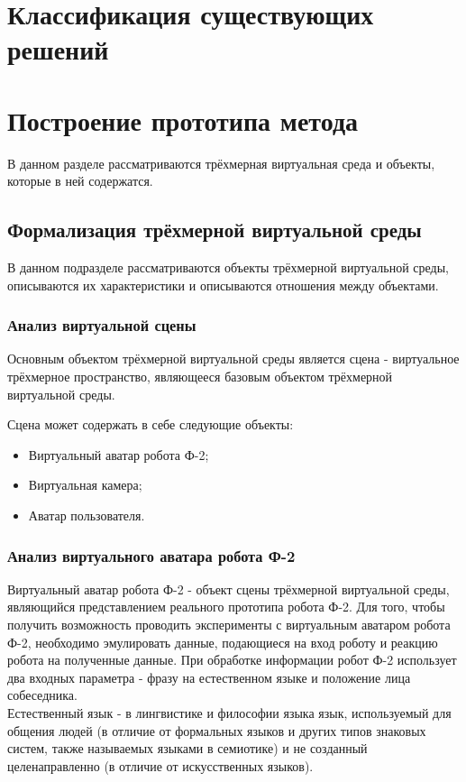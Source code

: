 \chapter{Классификация существующих решений}

\chapter{Построение прототипа метода}
В данном разделе рассматриваются трёхмерная виртуальная среда и объекты, которые в ней содержатся.

\section{Формализация трёхмерной виртуальной среды}
В данном подразделе рассматриваются объекты трёхмерной виртуальной среды, описываются их характеристики и описываются отношения между объектами.

\subsection{Анализ виртуальной сцены}
Основным объектом трёхмерной виртуальной среды является сцена - виртуальное трёхмерное пространство, являющееся базовым объектом трёхмерной виртуальной среды.

Сцена может содержать в себе следующие объекты:
\begin{itemize}
	\item Виртуальный аватар робота Ф-2;
	\item Виртуальная камера;
	\item Аватар пользователя.
\end{itemize}

\subsection{Анализ виртуального аватара робота Ф-2}
Виртуальный аватар робота Ф-2 - объект сцены трёхмерной виртуальной среды, являющийся представлением реального прототипа робота Ф-2.  Для того, чтобы получить возможность проводить эксперименты с виртуальным аватаром робота Ф-2, необходимо эмулировать данные, подающиеся на вход роботу и реакцию робота на полученные данные. При обработке информации робот Ф-2 использует два входных параметра - фразу на естественном языке и положение лица собеседника. \cite{f2} \\

Естественный язык - в лингвистике и философии языка язык, используемый для общения людей (в отличие от формальных языков и других типов знаковых систем, также называемых языками в семиотике) и не созданный целенаправленно (в отличие от искусственных языков). \cite{lang}\\

